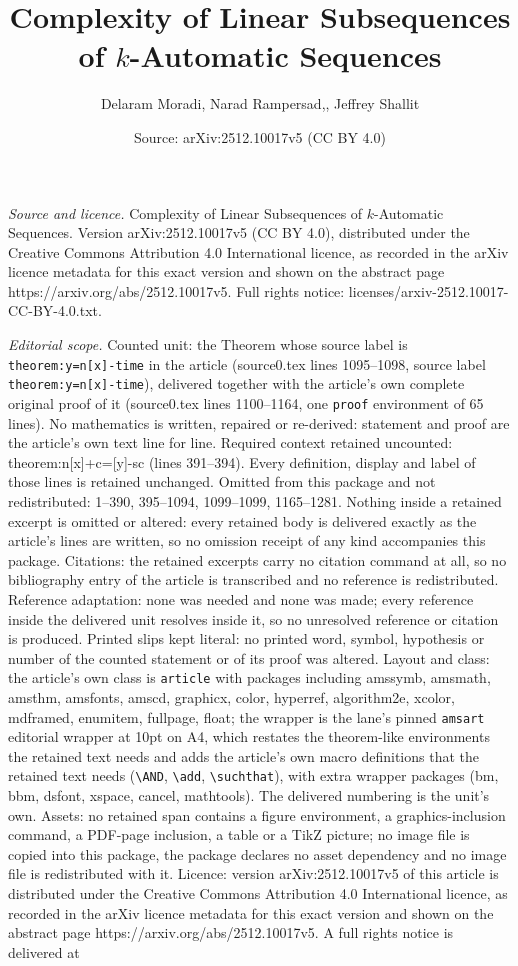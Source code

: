 \documentclass[10pt,a4paper]{amsart}
\title[Complexity of Linear Subsequences of $k$-Automatic Sequences]{Complexity of Linear Subsequences of $k$-Automatic Sequences}
\author{Delaram Moradi, Narad Rampersad,, Jeffrey Shallit}
\date{Source: arXiv:2512.10017v5 (CC BY 4.0)}
\begin{document}
\maketitle

\noindent\emph{Source and licence.} Complexity of Linear Subsequences of $k$-Automatic Sequences. Version arXiv:2512.10017v5 (CC BY 4.0), distributed under the Creative Commons Attribution 4.0 International licence, as recorded in the arXiv licence metadata for this exact version and shown on the abstract page https://arxiv.org/abs/2512.10017v5. Full rights notice: licenses/arxiv-2512.10017-CC-BY-4.0.txt.\par\smallskip

\noindent\textit{Editorial scope.} Counted unit: the Theorem whose source label is \texttt{theorem:y=n[x]-time} in the article (source0.tex lines 1095--1098, source label \texttt{theorem:y=n[x]-time}), delivered together with the article's own complete original proof of it (source0.tex lines 1100--1164, one \texttt{proof} environment of 65 lines). No mathematics is written, repaired or re-derived: statement and proof are the article's own text line for line. Required context retained uncounted: theorem:n[x]+c=[y]-sc (lines 391--394). Every definition, display and label of those lines is retained unchanged. Omitted from this package and not redistributed: 1--390, 395--1094, 1099--1099, 1165--1281. Nothing inside a retained excerpt is omitted or altered: every retained body is delivered exactly as the article's lines are written, so no omission receipt of any kind accompanies this package. Citations: the retained excerpts carry no citation command at all, so no bibliography entry of the article is transcribed and no reference is redistributed. Reference adaptation: none was needed and none was made; every reference inside the delivered unit resolves inside it, so no unresolved reference or citation is produced. Printed slips kept literal: no printed word, symbol, hypothesis or number of the counted statement or of its proof was altered. Layout and class: the article's own class is \texttt{article} with packages including amssymb, amsmath, amsthm, amsfonts, amscd, graphicx, color, hyperref, algorithm2e, xcolor, mdframed, enumitem, fullpage, float; the wrapper is the lane's pinned \texttt{amsart} editorial wrapper at 10pt on A4, which restates the theorem-like environments the retained text needs and adds the article's own macro definitions that the retained text needs (\texttt{\textbackslash AND}, \texttt{\textbackslash add}, \texttt{\textbackslash suchthat}), with extra wrapper packages (bm, bbm, dsfont, xspace, cancel, mathtools). The delivered numbering is the unit's own. Assets: no retained span contains a figure environment, a graphics-inclusion command, a PDF-page inclusion, a table or a TikZ picture; no image file is copied into this package, the package declares no asset dependency and no image file is redistributed with it. Licence: version arXiv:2512.10017v5 of this article is distributed under the Creative Commons Attribution 4.0 International licence, as recorded in the arXiv licence metadata for this exact version and shown on the abstract page https://arxiv.org/abs/2512.10017v5. A full rights notice is delivered at 
\end{document}

